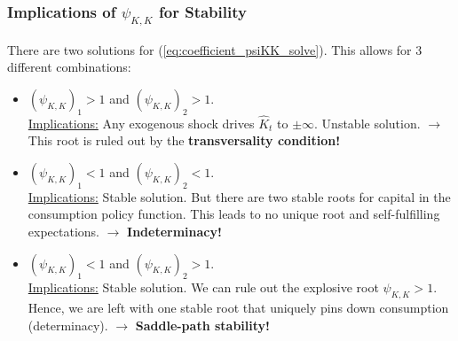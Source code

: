 \documentclass[10pt,c,aspectratio=1610,handout]{beamer}
\begin{document}
\begin{frame}%
  \frametitle{Implications of $\psi_{K,K}$ for Stability}%
  There are two solutions for (\ref{eq:coefficient_psiKK_solve}). This allows for 3 different combinations:%
  \pause%
  \begin{itemize}%
    \item[$\blacktriangleright$] $\left(\psi_{K,K}\right)_1>1$ and $\left(\psi_{K,K}\right)_2>1$.\\%
      \underline{Implications:} Any exogenous shock drives $\hat{K}_t$ to $\pm \infty$. Unstable solution. $\rightarrow$ This root is ruled out by the \textbf{transversality condition!}%
      \vspace*{0.1in}%
      \pause%
    \item[$\blacktriangleright$] $\left(\psi_{K,K}\right)_1<1$ and $\left(\psi_{K,K}\right)_2<1$.\\%
      \underline{Implications:} Stable solution. But there are two stable roots for capital in the consumption policy function. This leads to no unique root and self-fulfilling expectations. $\rightarrow$ \textbf{Indeterminacy!}%
      \vspace*{0.1in}%
      \pause%
    \item[$\blacktriangleright$] $\left(\psi_{K,K}\right)_1<1$ and $\left(\psi_{K,K}\right)_2>1$.\\%
      \underline{Implications:} Stable solution. We can rule out the explosive root $\psi_{K,K}>1$. Hence, we are left with one stable root that uniquely pins down consumption (determinacy). $\rightarrow$ \textbf{Saddle-path stability!}%
  \end{itemize}%
\end{frame}%
\end{document}
